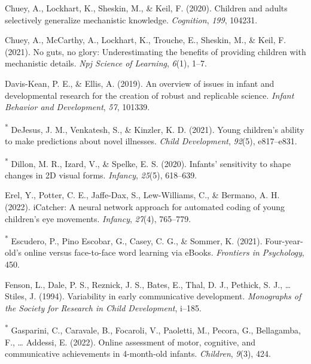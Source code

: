 \documentclass[
  man,floatsintext]{apa6}
\newlength{\cslhangindent}
\newlength{\cslentryspacingunit} %
\newenvironment{CSLReferences}[2] %
 {%
  \setlength{\parindent}{0pt}
  \ifodd #1
  \let\oldpar\par
  \def\par{\hangindent=\cslhangindent\oldpar}
  \fi
  \setlength{\parskip}{#2\cslentryspacingunit}
 }%
 {}
\begin{document}
\begin{CSLReferences}{1}{0}
\leavevmode{}%
Chuey, A., Lockhart, K., Sheskin, M., \& Keil, F. (2020). Children and adults selectively generalize mechanistic knowledge. \emph{Cognition}, \emph{199}, 104231.

\leavevmode{}%
Chuey, A., McCarthy, A., Lockhart, K., Trouche, E., Sheskin, M., \& Keil, F. (2021). No guts, no glory: Underestimating the benefits of providing children with mechanistic details. \emph{Npj Science of Learning}, \emph{6}(1), 1--7.

\leavevmode{}%
Davis-Kean, P. E., \& Ellis, A. (2019). An overview of issues in infant and developmental research for the creation of robust and replicable science. \emph{Infant Behavior and Development}, \emph{57}, 101339.

\leavevmode{}%
\textsuperscript{*} DeJesus, J. M., Venkatesh, S., \& Kinzler, K. D. (2021). Young children's ability to make predictions about novel illnesses. \emph{Child Development}, \emph{92}(5), e817--e831.

\leavevmode{}%
\textsuperscript{*} Dillon, M. R., Izard, V., \& Spelke, E. S. (2020). Infants' sensitivity to shape changes in 2D visual forms. \emph{Infancy}, \emph{25}(5), 618--639.

\leavevmode{}%
Erel, Y., Potter, C. E., Jaffe-Dax, S., Lew-Williams, C., \& Bermano, A. H. (2022). iCatcher: A neural network approach for automated coding of young children's eye movements. \emph{Infancy}, \emph{27}(4), 765--779.

\leavevmode{}%
\textsuperscript{*} Escudero, P., Pino Escobar, G., Casey, C. G., \& Sommer, K. (2021). Four-year-old's online versus face-to-face word learning via eBooks. \emph{Frontiers in Psychology}, 450.

\leavevmode{}%
Fenson, L., Dale, P. S., Reznick, J. S., Bates, E., Thal, D. J., Pethick, S. J., \ldots{} Stiles, J. (1994). Variability in early communicative development. \emph{Monographs of the Society for Research in Child Development}, i--185.

\leavevmode{}%
\textsuperscript{*} Gasparini, C., Caravale, B., Focaroli, V., Paoletti, M., Pecora, G., Bellagamba, F., \ldots{} Addessi, E. (2022). Online assessment of motor, cognitive, and communicative achievements in 4-month-old infants. \emph{Children}, \emph{9}(3), 424.


\end{CSLReferences}
\end{document}
